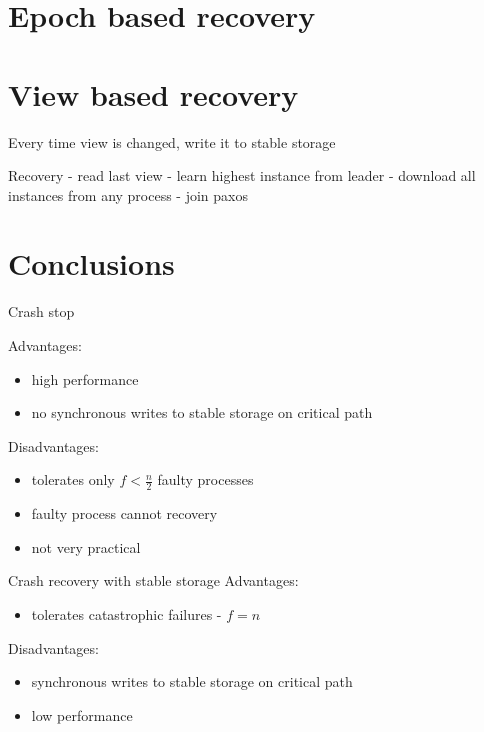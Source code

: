\section{Epoch based recovery}
\label{sec:epoch_ss}

\section{View based recovery}
\label{sec:view_ss}

\begin{TODO}
Every time view is changed, write it to stable storage

Recovery
- read last view
- learn highest instance from leader
- download all instances from any process
- join paxos
\end{TODO}


\section{Conclusions}

\begin{TODO}
Crash stop
\end{TODO}

Advantages:
\begin{itemize}
  \item high performance
  \item no synchronous writes to stable storage on critical path
\end{itemize}

Disadvantages:
\begin{itemize}
  \item tolerates only $f < \frac{n}{2}$ faulty processes
  \item faulty process cannot recovery 
  \item not very practical
\end{itemize}

Crash recovery with stable storage
Advantages:
\begin{itemize}
  \item tolerates catastrophic failures - $f = n$ 
\end{itemize}

Disadvantages:
\begin{itemize}
  \item synchronous writes to stable storage on critical path
  \item low performance
\end{itemize}
